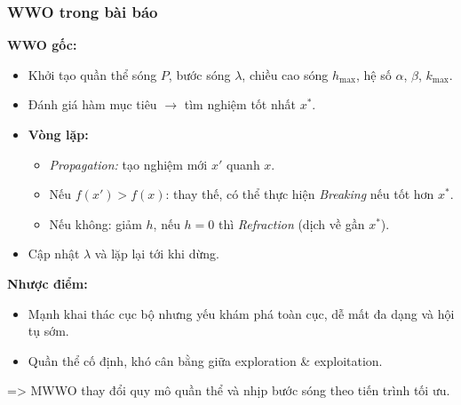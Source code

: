 \begin{frame}
    \frametitle{WWO trong bài báo}

    \textbf{WWO gốc:}
    \begin{itemize}
        \item Khởi tạo quần thể sóng $P$, bước sóng $\lambda$, chiều cao sóng $h_{\text{max}}$, hệ số $\alpha$, $\beta$, $k_{\text{max}}$.
        \item Đánh giá hàm mục tiêu $\to$ tìm nghiệm tốt nhất $x^*$.
        \item \textbf{Vòng lặp:} 
        \begin{itemize}
            \item \textit{Propagation:} tạo nghiệm mới $x'$ quanh $x$.
            \item Nếu $f(x') > f(x)$: thay thế, có thể thực hiện \textit{Breaking} nếu tốt hơn $x^*$.
            \item Nếu không: giảm $h$, nếu $h=0$ thì \textit{Refraction} (dịch về gần $x^*$).
        \end{itemize}
        \item Cập nhật $\lambda$ và lặp lại tới khi dừng.
    \end{itemize}

    \textbf{Nhược điểm:}
    \begin{itemize}
        \item Mạnh khai thác cục bộ nhưng yếu khám phá toàn cục, dễ mất đa dạng và hội tụ sớm.
        \item Quần thể cố định, khó cân bằng giữa exploration \& exploitation.
    \end{itemize}
    => MWWO thay đổi quy mô quần thể và nhịp bước sóng theo tiến trình tối ưu.

\end{frame}

